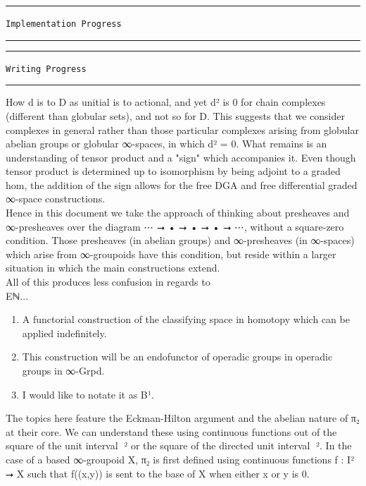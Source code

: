 \documentclass{book}
\theoremstyle{definition}
\begin{document}
\noindent\textcolor{Red}{\rule{16cm}{1mm}}
\begin{center}
\texttt{Implementation Progress}
\end{center}
\noindent\textcolor{Red}{\rule{16cm}{1mm}}

\noindent\textcolor{Red}{\rule{16cm}{1mm}}
\begin{center}
\texttt{Writing Progress}
\end{center}
\noindent\textcolor{Red}{\rule{16cm}{1mm}}

How d is to D as unitial is to actional, and yet d² is 0 for chain complexes (different than globular sets), and not so for D. This suggests that we consider complexes in general rather than those particular complexes arising from globular abelian groups or globular ∞-spaces, in which d² = 0. What remains is an understanding of tensor product and a "sign" which accompanies it. Even though tensor product is determined up to isomorphism by being adjoint to a graded hom, the addition of the sign allows for the free DGA and free differential graded ∞-space constructions.\\

Hence in this document we take the approach of thinking about presheaves and ∞-presheaves over the diagram ⋯ ⭢ • ⭢ • ⭢ • ⭢ ⋯, without a square-zero condition. Those presheaves (in abelian groups) and ∞-presheaves (in ∞-spaces) which arise from ∞-groupoids have this condition, but reside within a larger situation in which the main constructions extend.\\

All of this produces less confusion in regards to \\


Eℕ...\\



\begin{enumerate}
\item A functorial construction of the classifying space in homotopy which can be applied indefinitely.
\item This construction will be an endofunctor of operadic groups in operadic groups in ∞-Grpd.
\item I would like to notate it as B¹. 
\end{enumerate}

The topics here feature the Eckman-Hilton argument and the abelian nature of π₂ at their core. We can understand these using continuous functions out of the square of the unit interval γ⃡² or the square of the directed unit interval γ⃗². In the case of a based ∞-groupoid X, π₂ is first defined using continuous functions f : I² ⭢ X such that f((x,y)) is sent to the base of X when either x or y is 0.\\
\end{document}
